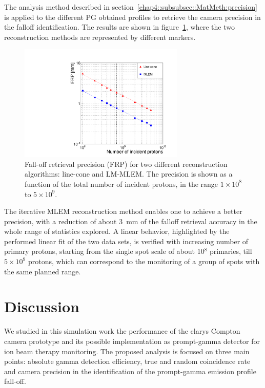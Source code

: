 The analysis method described in section~\ref{chap4::subsubsec::MatMeth:precision} is applied to the different PG obtained profiles to retrieve the camera precision in the falloff identification. The results are shown in figure~\ref{chap4::fig::precision}, where the two reconstruction methods are represented by different markers.

\begin{figure}	
\centering
\includegraphics[width=0.7\textwidth]{03_GraphicFiles/chapter4_HTsimu/new/precisionVSprimaries.pdf}
\caption{Fall-off retrieval precision (FRP) for two different reconstruction algorithms: line-cone and LM-MLEM. The precision is shown as a function of the total number of incident protons, in the range $1\times10^{8}$ to $5\times10^{9}$.}	
\label{chap4::fig::precision}
\end{figure}

The iterative MLEM reconstruction method enables one to achieve a better precision, with a reduction of about 3~mm of the falloff retrieval accuracy in the whole range of statistics explored. A linear behavior, highlighted by the performed linear fit of the two data sets, is verified with increasing number of primary protons, starting from the single spot scale of about 10$^8$ primaries, till $5\times10^9$ protons, which can correspond to the monitoring of a group of spots with the same planned range. 

\section{Discussion}

We studied in this simulation work the performance of the \gls{clarys} Compton camera prototype and its possible implementation as prompt-gamma detector for ion beam therapy monitoring. The proposed analysis is focused on three main points: absolute gamma detection efficiency, true and random coincidence rate and camera precision in the identification of the prompt-gamma emission profile fall-off.

